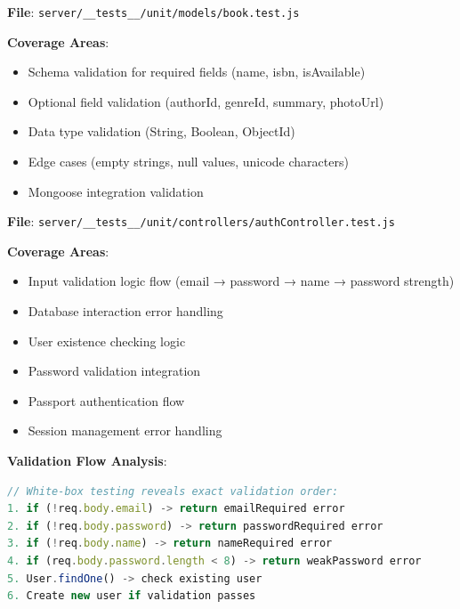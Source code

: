 \textbf{File}: \texttt{server/\_\_tests\_\_/unit/models/book.test.js}

\textbf{Coverage Areas}:
\begin{itemize}
    \item Schema validation for required fields (name, isbn, isAvailable)
    \item Optional field validation (authorId, genreId, summary, photoUrl)
    \item Data type validation (String, Boolean, ObjectId)
    \item Edge cases (empty strings, null values, unicode characters)
    \item Mongoose integration validation
\end{itemize}


\textbf{File}: \texttt{server/\_\_tests\_\_/unit/controllers/authController.test.js}

\textbf{Coverage Areas}:
\begin{itemize}
    \item Input validation logic flow (email → password → name → password strength)
    \item Database interaction error handling
    \item User existence checking logic
    \item Password validation integration
    \item Passport authentication flow
    \item Session management error handling
\end{itemize}

\textbf{Validation Flow Analysis}:
\begin{lstlisting}[language=JavaScript, caption=Authentication Validation Flow]
// White-box testing reveals exact validation order:
1. if (!req.body.email) -> return emailRequired error
2. if (!req.body.password) -> return passwordRequired error  
3. if (!req.body.name) -> return nameRequired error
4. if (req.body.password.length < 8) -> return weakPassword error
5. User.findOne() -> check existing user
6. Create new user if validation passes
\end{lstlisting}

